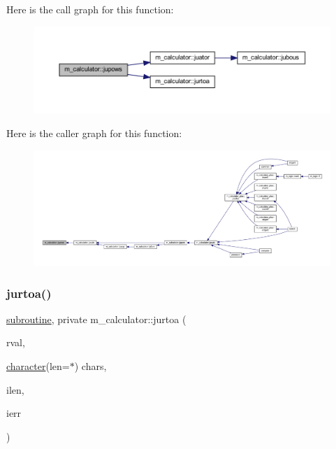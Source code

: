 Here is the call graph for this function\+:
\nopagebreak
\begin{figure}[H]
\begin{center}
\leavevmode
\includegraphics[width=350pt]{namespacem__calculator_ae1afc2ee970ad4635cce19b9b8b74f1c_cgraph}
\end{center}
\end{figure}
Here is the caller graph for this function\+:
\nopagebreak
\begin{figure}[H]
\begin{center}
\leavevmode
\includegraphics[width=350pt]{namespacem__calculator_ae1afc2ee970ad4635cce19b9b8b74f1c_icgraph}
\end{center}
\end{figure}
\mbox{\label{namespacem__calculator_a5031622e3d493b738ac425f1fa454a60}} 
\subsubsection{\texorpdfstring{jurtoa()}{jurtoa()}}
{\footnotesize\ttfamily \hyperlink{M__stopwatch_83_8txt_acfbcff50169d691ff02d4a123ed70482}{subroutine}, private m\+\_\+calculator\+::jurtoa (\begin{DoxyParamCaption}\item[{}]{rval,  }\item[{\hyperlink{option__stopwatch_83_8txt_abd4b21fbbd175834027b5224bfe97e66}{character}(len=$\ast$)}]{chars,  }\item[{}]{ilen,  }\item[{}]{ierr }\end{DoxyParamCaption})\hspace{0.3cm}{\ttfamily [private]}}



